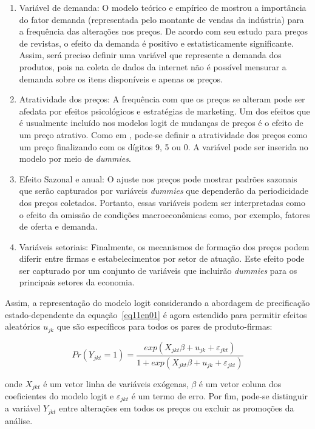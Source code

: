 \documentclass[twoside,a4paper,11pt]{report}
\begin{document}
\begin{enumerate}
  \item Variável de demanda: O modelo teórico e empírico de \citet{cecchetti1986frequency} mostrou a importância do fator demanda (representada pelo montante de vendas da indústria) para a frequência das alterações nos preços. De acordo com seu estudo para preços de revistas, o efeito da demanda é positivo e estatisticamente significante. Assim, será preciso definir uma variável que represente a demanda dos produtos, pois na coleta de dados da internet não é possível mensurar a demanda sobre os itens disponíveis e apenas os preços.
  \item Atratividade dos preços: A frequência com que os preços se alteram pode ser afedata por efeitos psicológicos e estratégias de marketing. Um dos efeitos que é usualmente incluído nos modelos logit de mudanças de preços é o efeito de um preço atrativo. Como em \citet{aucremanne2005time}, pode-se definir a atratividade dos preços como um preço finalizando com os dígitos 9, 5 ou 0. A variável pode ser inserida no modelo por meio de \emph{dummies}.
  \item Efeito Sazonal e anual: O ajuste nos preços pode mostrar padrões sazonais que serão capturados por variáveis \emph{dummies} que dependerão da periodicidade dos preços coletados. Portanto, essas variáveis podem ser interpretadas como o efeito da omissão de condições macroeconômicas como, por exemplo, fatores de oferta e demanda. 
  \item Variáveis setoriais: Finalmente, os mecanismos de formação dos preços podem diferir entre firmas e estabelecimentos por setor de atuação. Este efeito pode ser capturado por um conjunto de variáveis que incluirão \emph{dummies} para os principais setores da economia.
\end{enumerate}

Assim, a representação do modelo logit considerando a abordagem de precificação estado-dependente da equação~\ref{eq11en01} é agora estendido para permitir efeitos aleatórios $u_{jk}$ que são específicos para todos os pares de produto-firmas:

\begin{equation}\label{eq12en01}
Pr\left( { Y }_{ jkt }=1 \right) =\frac { exp\left( { X }_{ jkt }\beta +{ u }_{ jk }+{ \varepsilon  }_{ jkt } \right)  }{ 1+exp\left( { X }_{ jkt }\beta +{ u }_{ jk }+{ \varepsilon  }_{ jkt } \right)  } 
\end{equation}

\noindent onde ${ X }_{ jkt }$ é um vetor linha de variáveis exógenas, $\beta$ é um vetor coluna dos coeficientes do modelo logit e ${ \varepsilon  }_{ jkt }$ é um termo de erro. Por fim, pode-se distinguir a variável $Y_{jkt}$ entre alterações em todos os preços ou excluir as promoções da análise. 
\end{document}
